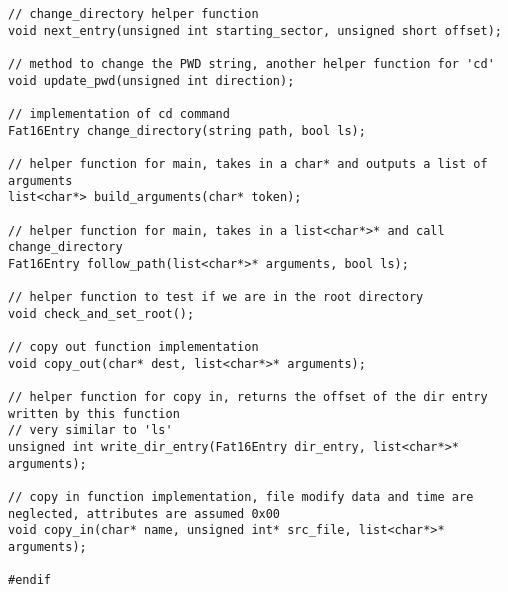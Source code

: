 \documentclass[12pt,letter,titlepage]{article}
\begin{document}
{{\begin{verbatim}
// change_directory helper function
void next_entry(unsigned int starting_sector, unsigned short offset);

// method to change the PWD string, another helper function for 'cd'
void update_pwd(unsigned int direction);

// implementation of cd command
Fat16Entry change_directory(string path, bool ls);

// helper function for main, takes in a char* and outputs a list of arguments
list<char*> build_arguments(char* token);

// helper function for main, takes in a list<char*>* and call change_directory
Fat16Entry follow_path(list<char*>* arguments, bool ls);

// helper function to test if we are in the root directory
void check_and_set_root();

// copy out function implementation
void copy_out(char* dest, list<char*>* arguments);

// helper function for copy in, returns the offset of the dir entry written by this function
// very similar to 'ls'
unsigned int write_dir_entry(Fat16Entry dir_entry, list<char*>* arguments);

// copy in function implementation, file modify data and time are neglected, attributes are assumed 0x00
void copy_in(char* name, unsigned int* src_file, list<char*>* arguments);

#endif
\end{verbatim}
}}
\end{document}
